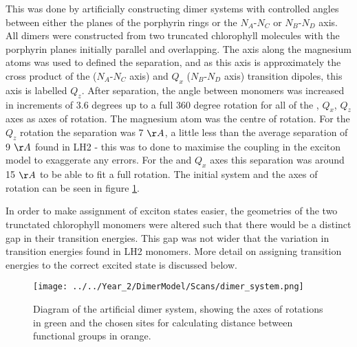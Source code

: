 This was done by artificially constructing dimer systems with controlled angles 
between either the planes of the porphyrin rings or the $N_A$-$N_C$ or $N_B$-$N_D$
axis. All dimers were constructed from two truncated chlorophyll molecules with 
the porphyrin planes initially parallel and overlapping. The axis along the magnesium
atoms was used to defined the separation, and as this axis is approximately the 
cross product of the \Qy ($N_A$-$N_C$ axis) and $Q_x$ ($N_B$-$N_D$ axis) transition
dipoles, this axis is labelled $Q_z$. After separation, the angle between monomers
was increased in increments of 3.6 degrees up to a full 360 degree rotation for 
all of the \Qy, $Q_x$, $Q_z$ axes as axes of rotation. The magnesium atom was the 
centre of rotation. For the $Q_z$ rotation the separation was 7 $\AA{}$, a little 
less than the average separation of 9 $\AA{}$ found in LH2 - this was to done to 
maximise the coupling in the exciton model to exaggerate any errors. For the \Qy
and $Q_x$ axes this separation was around 15 $\AA{}$ to be able to fit a full rotation.
The initial system and the axes of rotation can be seen in figure \ref{fig:dimer_system}.

In order to make assignment of exciton states easier, the geometries of the two 
trunctated chlorophyll monomers were altered such that there would be a distinct 
gap in their transition energies. This gap was not wider that the variation in 
transition energies found in LH2 monomers. More detail on assigning transition 
energies to the correct excited state is discussed below.

\begin{figure}
    \centering
    \texttt{[image: ../../Year\_2/DimerModel/Scans/dimer\_system.png]}
    \label{fig:dimer_system}
    \caption{Diagram of the artificial dimer system, showing the axes of rotations
    in green and the chosen sites for calculating distance between functional groups
    in orange.}
\end{figure}

